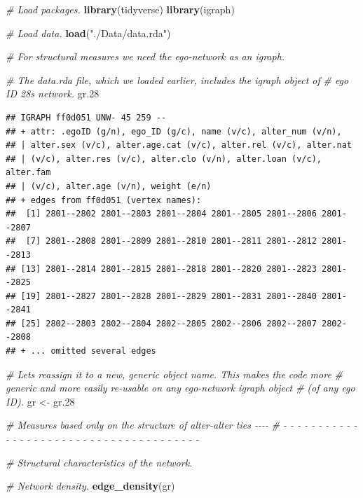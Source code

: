 \documentclass[
]{book}
\newenvironment{Shaded}{\begin{snugshade}}{\end{snugshade}}
\newcommand{\CommentTok}[1]{\textcolor[rgb]{0.56,0.35,0.01}{\textit{#1}}}
\newcommand{\FloatTok}[1]{\textcolor[rgb]{0.00,0.00,0.81}{#1}}
\newcommand{\FunctionTok}[1]{\textcolor[rgb]{0.13,0.29,0.53}{\textbf{#1}}}
\newcommand{\NormalTok}[1]{#1}
\newcommand{\OtherTok}[1]{\textcolor[rgb]{0.56,0.35,0.01}{#1}}
\newcommand{\StringTok}[1]{\textcolor[rgb]{0.31,0.60,0.02}{#1}}
\begin{document}
\begin{Shaded}
\begin{Highlighting}[]
\CommentTok{\# Load packages.}
\FunctionTok{library}\NormalTok{(tidyverse)}
\FunctionTok{library}\NormalTok{(igraph)}

\CommentTok{\# Load data.}
\FunctionTok{load}\NormalTok{(}\StringTok{"./Data/data.rda"}\NormalTok{)}

\CommentTok{\# For structural measures we need the ego{-}network as an igraph.}

\CommentTok{\# The data.rda file, which we loaded earlier, includes the igraph object of}
\CommentTok{\# ego ID 28\textquotesingle{}s network.}
\NormalTok{gr}\FloatTok{.28}
\end{Highlighting}
\end{Shaded}

\begin{verbatim}
## IGRAPH ff0d051 UNW- 45 259 -- 
## + attr: .egoID (g/n), ego_ID (g/c), name (v/c), alter_num (v/n),
## | alter.sex (v/c), alter.age.cat (v/c), alter.rel (v/c), alter.nat
## | (v/c), alter.res (v/c), alter.clo (v/n), alter.loan (v/c), alter.fam
## | (v/c), alter.age (v/n), weight (e/n)
## + edges from ff0d051 (vertex names):
##  [1] 2801--2802 2801--2803 2801--2804 2801--2805 2801--2806 2801--2807
##  [7] 2801--2808 2801--2809 2801--2810 2801--2811 2801--2812 2801--2813
## [13] 2801--2814 2801--2815 2801--2818 2801--2820 2801--2823 2801--2825
## [19] 2801--2827 2801--2828 2801--2829 2801--2831 2801--2840 2801--2841
## [25] 2802--2803 2802--2804 2802--2805 2802--2806 2802--2807 2802--2808
## + ... omitted several edges
\end{verbatim}

\begin{Shaded}
\begin{Highlighting}[]
\CommentTok{\# Let\textquotesingle{}s reassign it to a new, generic object name. This makes the code more }
\CommentTok{\# generic and more easily re{-}usable on any ego{-}network igraph object }
\CommentTok{\# (of any ego ID).}
\NormalTok{gr }\OtherTok{\textless{}{-}}\NormalTok{ gr}\FloatTok{.28}

\CommentTok{\# Measures based only on the structure of alter{-}alter ties                  {-}{-}{-}{-}}
\CommentTok{\# {-} {-} {-} {-} {-} {-} {-} {-} {-} {-} {-} {-} {-} {-} {-} {-} {-} {-} {-} {-} {-} {-} {-} {-} {-} {-} {-} {-} {-} {-} {-} {-} {-} {-} {-} {-} {-} {-} {-} }

\CommentTok{\# Structural characteristics of the network.}

\CommentTok{\# Network density.}
\FunctionTok{edge\_density}\NormalTok{(gr)}
\end{Highlighting}
\end{Shaded}
\end{document}

